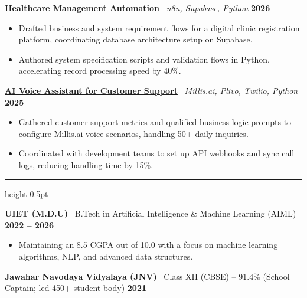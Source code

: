\documentclass[10pt,a4paper]{article}
\newcommand{\resumesection}[2]{
  \vspace{3pt}
  \noindent{\large\bfseries\sffamily\color{navyblue}{\mbox{#1}}\hspace{6pt}{\sffamily #2}}
  \vspace{1pt}
  \hrule height 0.5pt
  \vspace{2pt}
}
\begin{document}
\vspace{3pt}

\noindent
\href{https://www.linkedin.com/posts/anshu-hooda027_hospitalautomation-n8n-healthtech-activity-7426505092507529216-IOsu}{\textbf{Healthcare Management Automation}} \textbar\ \textit{n8n, Supabase, Python} \hfill \textbf{2026}
\begin{itemize}[leftmargin=*, noitemsep, topsep=1pt, parsep=0.5pt, partopsep=0pt, itemsep=0.5pt]
    \item Drafted business and system requirement flows for a digital clinic registration platform, coordinating database architecture setup on Supabase.
    \item Authored system specification scripts and validation flows in Python, accelerating record processing speed by 40\%.
\end{itemize}

\vspace{3pt}

\noindent
\href{https://www.linkedin.com/posts/anshu-hooda027_voiceai-promptengineering-bilingualagent-activity-7381713363325706240-yXGS}{\textbf{AI Voice Assistant for Customer Support}} \textbar\ \textit{Millis.ai, Plivo, Twilio, Python} \hfill \textbf{2025}
\begin{itemize}[leftmargin=*, noitemsep, topsep=1pt, parsep=0.5pt, partopsep=0pt, itemsep=0.5pt]
    \item Gathered customer support metrics and qualified business logic prompts to configure Millis.ai voice scenarios, handling 50+ daily inquiries.
    \item Coordinated with development teams to set up API webhooks and sync call logs, reducing handling time by 15\%.
\end{itemize}

\resumesection{\faGraduationCap}{Education}

\noindent
\textbf{UIET (M.D.U)} \textbar\ B.Tech in Artificial Intelligence \& Machine Learning (AIML) \hfill \textbf{2022 -- 2026}
\begin{itemize}[leftmargin=*, noitemsep, topsep=1pt, parsep=0.5pt, partopsep=0pt, itemsep=0.5pt]
    \item Maintaining an 8.5 CGPA out of 10.0 with a focus on machine learning algorithms, NLP, and advanced data structures.
\end{itemize}

\vspace{3pt}

\noindent
\textbf{Jawahar Navodaya Vidyalaya (JNV)} \textbar\ Class XII (CBSE) -- 91.4\% (School Captain; led 450+ student body) \hfill \textbf{2021}
\end{document}
